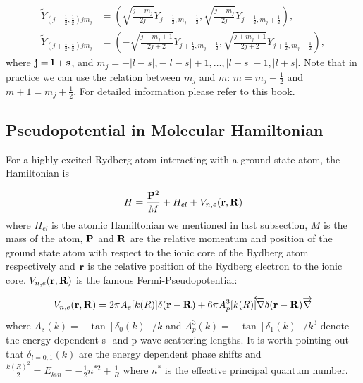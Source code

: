 \documentclass[british,english]{article}
\numberwithin{equation}{section}
\numberwithin{figure}{section}
\begin{document}
\begin{equation}
\begin{aligned}
\tilde{Y}_{(j-\frac{1}{2},\frac{1}{2})j m_{j}}&=\left(\sqrt{\frac{j+m_{j}}{2j}}Y_{j-\frac{1}{2},m_{j}-\frac 12}, \sqrt{\frac{j-m_{j}}{2j}}Y_{j-\frac 12,m_{j}+\frac 12}\right),\\
\tilde{Y}_{(j+\frac{1}{2},\frac{1}{2})jm_{j}}&=\left(-\sqrt{\frac{j-m_{j}+1}{2j+2}}Y_{j+\frac{1}{2},m_{j}-\frac 12}, \sqrt{\frac{j+m_{j}+1}{2j+2}}Y_{j+\frac 12,m_{j}+\frac 12}\right),
\label{equ:spinors}
\end{aligned}
\end{equation}
where $ {\bf j} = {\bf l} + {\bf s}$, and $m_{j} = -|l-s|,-|l-s|+1,\dots,|l+s|-1,|l+s|$. Note that in practice we can use the relation between $m_j$ and $m$: $m=m_j-\frac {1}{2}$ and $m+1 = m_j + \frac{1}{2}$. For detailed information please refer to this book.\cite{Biedenharn1981}
\subsection{Pseudopotential in Molecular Hamiltonian}

For a highly excited Rydberg atom interacting with a ground state
atom, the Hamiltonian is

\begin{equation}
H=\frac{{\bf P}^{2}}{M}+H_{el}+V_{n,e}({\bf r,R})
\end{equation}
where $H_{el}$ is the atomic Hamiltonian we mentioned in last subsection,
$M$ is the mass of the atom, ${\bf P}$ and ${\bf R}$ are the relative
momentum and position of the ground state atom with respect to the
ionic core of the Rydberg atom respectively and ${\bf r}$ is the
relative position of the Rydberg electron to the ionic core. $V_{n,e}({\bf r,R})$
is the famous Fermi-Pseudopotential:

\begin{equation}
V_{n,e}({\bf r,R})=2\pi A_{s}[k(R)]\delta({\bf r}-{\bf R})+6\pi A_{p}^{3}[k(R)\overleftarrow{]\nabla}\delta({\bf r}-{\bf R})\overrightarrow{\nabla}
\end{equation}
where $A_{s}(k)=-\tan[\delta_{0}(k)]/k$ and $A_{p}^{3}(k)=-\tan[\delta_{1}(k)]/k^{3}$
denote the energy-dependent s- and p-wave scattering lengths.
It is worth pointing out that $\delta_{l=0,1}(k)$ are the energy
dependent phase shifts and $\frac{k(R)^{2}}{2}=E_{kin}=-\frac{1}{2}n^{*2}+\frac{1}{R}$
where $n^{*}$ is the effective principal quantum number.
\end{document}
